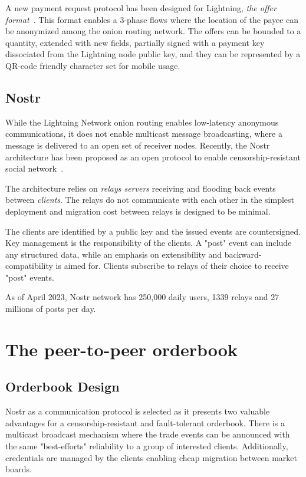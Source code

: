 \documentclass[pdflatex,sn-mathphys]{sn-jnl}%
\theoremstyle{thmstyleone}%
\theoremstyle{thmstyletwo}%
\theoremstyle{thmstylethree}%
\begin{document}
A new payment request protocol has been designed for Lightning, \textit{the offer format}~\cite{Offer2020Russell}. This format enables a 3-phase flows where the location of the payee can be anonymized among the onion routing network. The offers can be bounded to a quantity, extended with new fields, partially signed with a payment key dissociated from the Lightning node public key, and they can be represented by a QR-code friendly character set for mobile usage.

\subsection{Nostr}

While the Lightning Network onion routing enables low-latency anonymous communications, it does not enable multicast message broadcasting, where a message is delivered to an open set of receiver nodes. Recently, the Nostr architecture has been proposed as an open protocol to enable censorship-resistant social network~\cite{Nostr2022Nostrdevs}.

The architecture relies on \textit{relays servers} receiving and flooding back events between \textit{clients}. The relays do not communicate with each other in the simplest deployment and migration cost between relays is designed to be minimal.

The clients are identified by a public key and the issued events are countersigned. Key management is the responsibility of the clients. A "post" event can include any structured data, while an emphasis on extensibility and backward-compatibility is aimed for. Clients subscribe to relays of their choice to receive "post" events.

As of April 2023, Nostr network has 250,000 daily users, 1339 relays and 27 millions of posts per day.

\section{The peer-to-peer orderbook}

\subsection{Orderbook Design}

Nostr as a communication protocol is selected as it presents two
valuable advantages for a censorship-resistant and fault-tolerant orderbook. There is a multicast broadcast mechanism where the trade events can be announced with the same "best-efforts" reliability to a group of interested clients. Additionally, credentials are managed by the clients enabling cheap migration between market boards.
\end{document}

